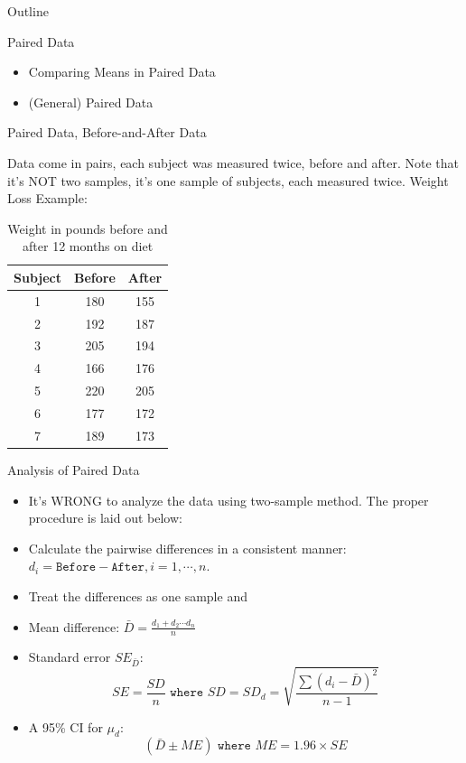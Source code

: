 \documentclass[14pt]{beamer}\usepackage[]{graphicx}\usepackage[]{color}
\begin{document}
\begin{frame}[fragile]{Outline}

Paired Data

\begin{itemize}
\item Comparing Means in Paired Data  
\item (General) Paired Data
\end{itemize}
\end{frame}

\begin{frame}[fragile]{Paired Data, Before-and-After Data}

{\small{
Data come in pairs, each subject was measured twice, before and  after.  Note that it's NOT two samples, it's one sample of subjects, each  measured twice. Weight Loss Example:
}}

\begin{table}
{\footnotesize{
\caption{Weight in pounds before and  after 12 months on diet}
\begin{tabular}{@{} ccc @{}} \hline
Subject & Before & After \\ \hline
1 & 180 & 155 \\
2 & 192 & 187 \\
3 & 205 & 194 \\
4 & 166 & 176 \\
5 & 220 & 205 \\
6 & 177 & 172 \\
7 & 189 & 173 \\ \hline
\end{tabular}
}}
\end{table}

\end{frame}

\begin{frame}[fragile]{Analysis of Paired Data}

{\small{
\begin{itemize}
\item It's WRONG to analyze the data using two-sample method. The proper  procedure is laid out below:
\item Calculate the pairwise differences in a consistent manner:
$d_i = \texttt{Before} - \texttt{After}, i = 1, \cdots , n$.
\item Treat the differences as one sample and
\item Mean difference: $\bar{D} = \frac{ d_1 + d_2 \cdots d_n}{n} $
\item Standard error $SE_{\bar{D}}$:
  {\scriptsize{
  \begin{equation*}
    SE = \frac{SD}{n} \texttt{  where } SD = SD_{d} = \sqrt{ \frac{ \sum (d_i - \bar{D})^2}{n - 1}}
  \end{equation*}
  }}
\item A 95\% CI for $\mu_d$:
  \begin{equation*}
    (\bar{D} \pm ME) \texttt{ where } ME = 1.96 \times SE
  \end{equation*}
\end{itemize}
}}
\end{frame}
\end{document}
